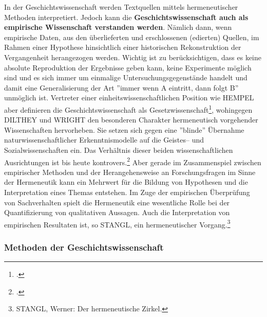 \documentclass[12pt,a4paper]{article}
\begin{document}
In der Geschichtswissenschaft werden Textquellen mittels hermeneutischer Methoden interpretiert. Jedoch kann die \textbf{Geschichtswissenschaft auch als empirische Wissenschaft verstanden werden}. Nämlich dann, wenn empirische Daten, aus den überlieferten und erschlossenen (edierten) Quellen, im Rahmen einer Hypothese hinsichtlich einer historischen Rekonstruktion der Vergangenheit herangezogen werden. Wichtig ist zu berücksichtigen, dass es keine absolute Reproduktion der Ergebnisse geben kann, keine Experimente möglich sind und es sich immer um einmalige Untersuchungsgegenstände handelt und damit eine Generalisierung der Art ''immer wenn A eintritt, dann folgt B'' unmöglich ist. Vertreter einer einheitswissenschaftlichen Position wie HEMPEL aber definieren die Geschichtswissenschaft als Gesetzwissenschaft\footcite[][S.79-80]{nussel2018offenbarung}, wohingegen DILTHEY und WRIGHT den besonderen Charakter hermeneutisch vorgehender Wissenschaften hervorheben. Sie setzen sich gegen eine ''blinde'' Übernahme naturwissenschaftlicher Erkenntnismodelle auf die Geistes-- und Sozialwissenschaften ein. Das Verhältnis dieser beiden wissenschaftlichen Ausrichtungen ist bis heute kontrovers.\footcite{wellmer1979georg} Aber gerade im Zusammenspiel zwischen empirischer Methoden und der Herangehensweise an Forschungsfragen im Sinne der Hermeneutik kann ein Mehrwert für die Bildung von Hypothesen und die Interpretation eines Themas entstehen. Im Zuge der empirischen Überprüfung von Sachverhalten spielt die Hermeneutik eine wesentliche Rolle bei der Quantifizierung von qualitativen Aussagen. Auch die Interpretation von empirischen Resultaten ist, so STANGL, ein hermeneutischer Vorgang.\footnote{STANGL, Werner: Der hermeneutische Zirkel.}

\subsubsection{Methoden der Geschichtswissenschaft}
\label{ref:Methoden}
\end{document}
